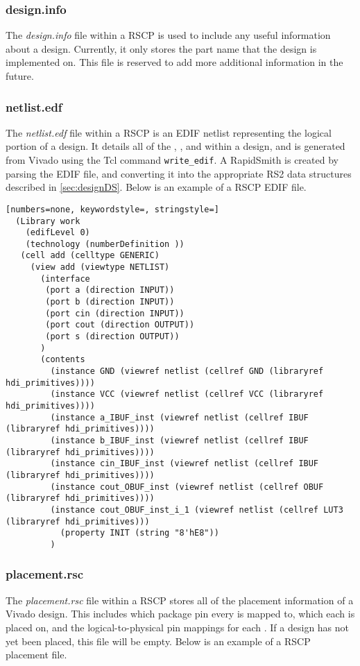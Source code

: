 \subsubsection{design.info}
The \textit{design.info} file within a RSCP is used to include any useful
information about a design. Currently, it only stores the part name that the
design is implemented on. This file is reserved to add more additional
information in the future.

\subsubsection{netlist.edf}
The \textit{netlist.edf} file within a RSCP is an EDIF netlist representing the
logical portion of a design. It details all of the \cells, \nets,
and \ports within a design, and is generated from Vivado using the Tcl
command \texttt{write\_edif}. A RapidSmith \celldesign is created by parsing the
EDIF file, and converting it into the appropriate RS2 data structures described
in \autoref{sec:designDS}. Below is an example of a RSCP EDIF file.

\begin{lstlisting}[numbers=none, keywordstyle=, stringstyle=]
  (Library work
    (edifLevel 0)
    (technology (numberDefinition ))
   (cell add (celltype GENERIC)
     (view add (viewtype NETLIST)
       (interface 
        (port a (direction INPUT))
        (port b (direction INPUT))
        (port cin (direction INPUT))
        (port cout (direction OUTPUT))
        (port s (direction OUTPUT))
       )
       (contents
         (instance GND (viewref netlist (cellref GND (libraryref hdi_primitives))))
         (instance VCC (viewref netlist (cellref VCC (libraryref hdi_primitives))))
         (instance a_IBUF_inst (viewref netlist (cellref IBUF (libraryref hdi_primitives))))
         (instance b_IBUF_inst (viewref netlist (cellref IBUF (libraryref hdi_primitives))))
         (instance cin_IBUF_inst (viewref netlist (cellref IBUF (libraryref hdi_primitives))))
         (instance cout_OBUF_inst (viewref netlist (cellref OBUF (libraryref hdi_primitives))))
         (instance cout_OBUF_inst_i_1 (viewref netlist (cellref LUT3 (libraryref hdi_primitives)))
           (property INIT (string "8'hE8"))
         )
\end{lstlisting}

\subsubsection{placement.rsc}
The \textit{placement.rsc} file within a RSCP stores all of the placement
information of a Vivado design. This includes which package pin every \port is
mapped to, which \bel each \cell is placed on, and the logical-to-physical pin
mappings for each \cellpin. If a design has not yet been placed, this file
will be empty. Below is an example of a RSCP placement file.

